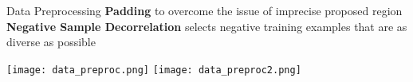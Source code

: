 \begin{frame}{Data Preprocessing}
  \small
  \textbf{Padding} to overcome the issue of imprecise proposed region\\
  \textbf{Negative Sample Decorrelation} selects negative training examples that are as diverse as possible\\
  \begin{center}
\texttt{[image: data\_preproc.png]}
    \hspace{2mm}
\texttt{[image: data\_preproc2.png]}
  \end{center}

\end{frame}

